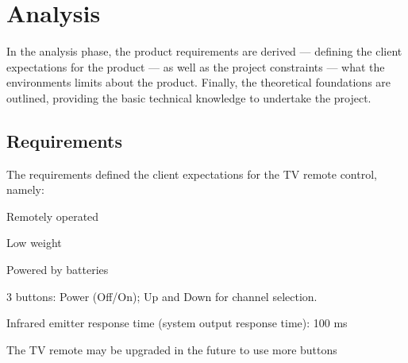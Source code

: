 \chapter{Analysis}
\label{ch:analysis}
In the analysis
phase, the product requirements are derived --- defining the client expectations
for the product --- as well as the project constraints --- what the environments
limits about the product. Finally, the theoretical foundations are outlined,
providing the basic technical knowledge to undertake the project.
%
  \vspace{-5mm}
%  
\section{Requirements}
\label{sec:requirements}
The requirements defined the client expectations for the TV remote control,
namely:
\begin{item-c}
\item Remotely operated
\item Low weight
\item Powered by batteries
\item 3 buttons: Power (Off/On); Up and Down for channel selection.
\item Infrared emitter response time (system output response time): 100 ms
\item The TV remote may be upgraded in the future to use more buttons
\end{item-c}
%
  \vspace{-5mm}
%  
